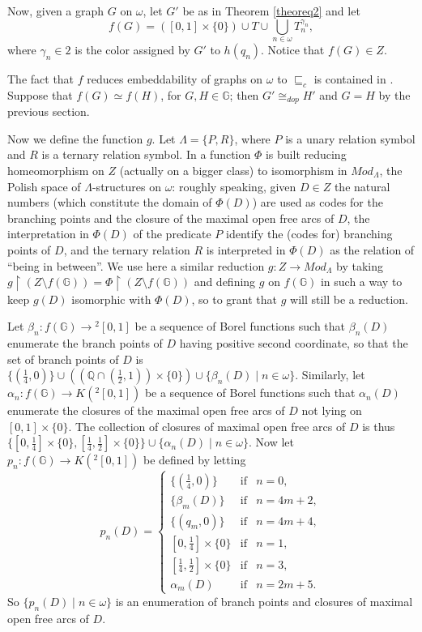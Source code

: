\documentclass{amsart}
\theoremstyle{definition}
\theoremstyle{remark}
\begin{document}
Now, given a graph $G$ on $\omega $, let $G'$ be as in Theorem
\ref{theoreq2} and let
$$f(G)=([0,1]\times\{ 0\} )\cup T\cup\bigcup_{n\in\omega }T_n^{\gamma_n},$$
where $\gamma_n\in 2$ is the color assigned by $G'$ to $h(q_n)$. Notice
that $f(G)\in Z$.

The fact that $f$ reduces embeddability of graphs on $\omega $ to
$\sqsubseteq_c$ is contained in \cite{Camerlo}.
Suppose that $f(G)\simeq f(H)$, for $G,H\in {\mathbb{G}} $; then
$G'\cong_{dop}H'$ and $G=H$ by the previous section.

Now we define the function $g$. Let $\Lambda =\{ P,R\} $, where $P$ is
a unary relation symbol and $R$ is a ternary relation symbol.
In \cite{CDM2005} a function $\Phi $ is built reducing homeomorphism
on $Z$ (actually on a bigger class) to isomorphism in $Mod_{\Lambda
}$, the Polish space of $\Lambda $-structures on $\omega$: roughly
speaking, given $D \in Z$ the natural numbers (which constitute the
domain of $\Phi(D)$) are used as codes for the branching points and the
closure
of the maximal open free arcs of $D$, the interpretation in $\Phi(D)$
of the predicate $P$ identify the (codes for) branching points of $D$,
and the ternary relation $R$ is interpreted in $\Phi(D)$ as the
relation of ``being in between''.
We use here a similar reduction $g \colon Z\to Mod_{\Lambda }$ by taking
$g\restriction (Z\setminus f( {\mathbb{G}} ))=\Phi\restriction (Z\setminus f( {\mathbb{G}}
))$ and defining $g$ on $f( {\mathbb{G}} )$ in such a way to keep $g(D)$
isomorphic with $\Phi (D)$, so to grant that $g$ will still be a
reduction.

Let $\beta_n \colon f( {\mathbb{G}} )\to {}^2[0,1]$ be a sequence of Borel functions
such that $\beta_n(D)$ enumerate the branch points of $D$ having
positive second coordinate, so that the set of branch points of $D$ is
$\{ ( \frac 14,0)\}\cup (( {\mathbb{Q}} \cap ( \frac 12 ,1))\times\{ 0\})\cup\{\beta_n(D)\mid n\in\omega\} $.
Similarly, let $\alpha_n \colon f( {\mathbb{G}} )\to K({}^2[0,1])$ be a sequence of
Borel functions such that $\alpha_n(D)$ enumerate the closures of the
maximal open free arcs of $D$ not lying on $[0,1]\times\{ 0\} $.
The collection of closures of maximal open free arcs of $D$ is thus
$\{ [0, \frac 14 ]\times\{ 0\} ,[ \frac 14 , \frac 12 ]\times\{ 0\}\}\cup\{\alpha_n(D)\mid n\in\omega\} $.
Now let $p_n \colon f( {\mathbb{G}} )\to K ({}^2[0,1])$ be defined by letting
$$p_n(D)= \left \{
\begin{array}{lcl}
\{ ( \frac 14 ,0)\} & \mbox{if} & n=0, \\
\{\beta_m(D)\} & \mbox{if} & n=4m+2, \\
\{ (q_m,0)\} & \mbox{if} & n=4m+4, \\
{}[0, \frac 14 ]\times\{ 0\} & \mbox{if} & n=1, \\
{}[ \frac 14 , \frac 12 ]\times\{ 0\} & \mbox{if} & n=3, \\
\alpha_m(D) & \mbox{if} & n=2m+5.
\end{array}
\right .
$$
So $\{ p_n(D)\mid n\in\omega\} $ is an enumeration of branch points and closures of maximal open free arcs of $D$.
\end{document}
